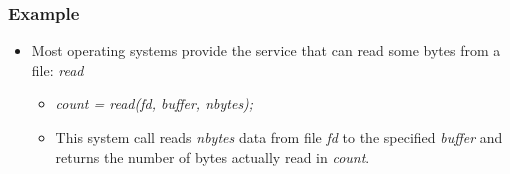 \documentclass[CJKutf8,xcolor=pdftex,dvipsnames,table]{beamer}
\begin{document}
\begin{CJK*}{UTF8}{song}
  \begin{frame}
    \frametitle{Example} \pause
    \begin{itemize}
    \item{Most operating systems provide the service that can read some bytes from a file: \emph{read}} \pause
      \begin{itemize}
      \item{\emph{count = read(fd, buffer, nbytes);}} \pause
      \item{This system call reads \emph{nbytes} data from file \emph{fd} to the specified \emph{buffer} and returns the number of bytes actually read in \emph{count}.}
      \end{itemize}
    \end{itemize}
  \end{frame}


\end{CJK*}
\end{document}
